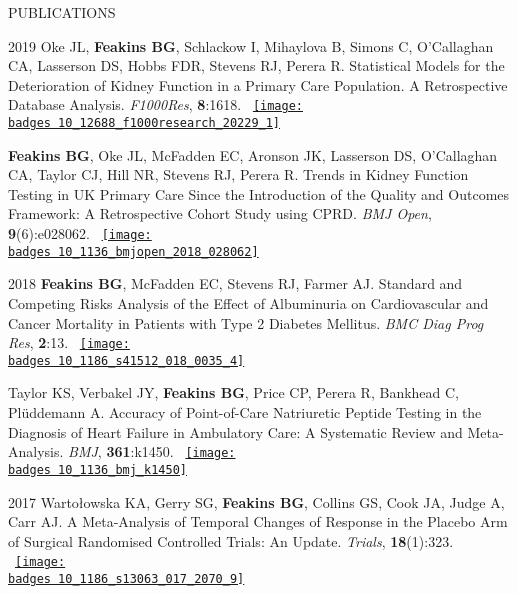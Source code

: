 \documentclass[10pt,a4paper]{article}
\def\badges{./badges/}
\begin{document}
\begin{cvlist}{PUBLICATIONS}
	\item[2019]
	Oke JL, \textbf{Feakins BG}, Schlackow I, Mihaylova B, Simons C, O'Callaghan CA, Lasserson DS, Hobbs FDR, Stevens RJ, Perera R. Statistical Models for the Deterioration of Kidney Function in a Primary Care Population. A Retrospective Database Analysis. \textit{F1000Res}, \textbf{8}:1618. ~\href{https://f1000research.altmetric.com/details/66389361}{\texttt{[image: \\badges 10\_12688\_f1000research\_20229\_1]}}
	
	\item[]
	\textbf{Feakins BG}, Oke JL, McFadden EC, Aronson JK, Lasserson DS, O'Callaghan CA, Taylor CJ, Hill NR, Stevens RJ, Perera R. Trends in Kidney Function Testing in UK Primary Care Since the Introduction of the Quality and Outcomes Framework: A Retrospective Cohort Study using CPRD. \textit{BMJ Open}, \textbf{9}(6):e028062. ~\href{https://bmj.altmetric.com/details/62023045}{\texttt{[image: \\badges 10\_1136\_bmjopen\_2018\_028062]}}
	
	\item[2018]
	\textbf{Feakins BG}, McFadden EC, Stevens RJ, Farmer AJ. Standard and Competing Risks Analysis of the Effect of Albuminuria on Cardiovascular and Cancer Mortality in Patients with Type 2 Diabetes Mellitus. \textit{BMC Diag Prog Res}, \textbf{2}:13. ~\href{https://biomedcentral.altmetric.com/details/45475518}{\texttt{[image: \\badges 10\_1186\_s41512\_018\_0035\_4]}}
	
	\item[]
	Taylor KS, Verbakel JY, \textbf{Feakins BG}, Price CP, Perera R, Bankhead C, Pl\"uddemann A. Accuracy of Point-of-Care Natriuretic Peptide Testing in the Diagnosis of Heart Failure in Ambulatory Care: A Systematic Review and Meta-Analysis. \textit{BMJ}, \textbf{361}:k1450. ~\href{https://bmj.altmetric.com/details/42193657}{\texttt{[image: \\badges 10\_1136\_bmj\_k1450]}}
	
	\item[2017]
	Warto\l{}owska KA, Gerry SG, \textbf{Feakins BG}, Collins GS, Cook JA, Judge A, Carr AJ. A Meta-Analysis of Temporal Changes of Response in the Placebo Arm of Surgical Randomised Controlled Trials: An Update. \textit{Trials}, \textbf{18}(1):323. ~\href{https://biomedcentral.altmetric.com/details/21804060}{\texttt{[image: \\badges 10\_1186\_s13063\_017\_2070\_9]}}
	

\end{cvlist}
\end{document}
